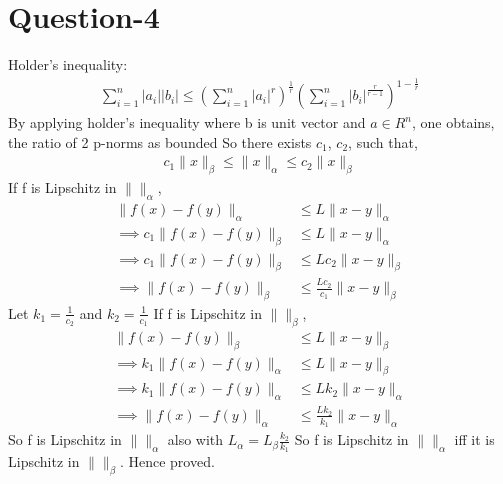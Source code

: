 \documentclass{article}
\begin{document}
\section*{Question-4}
Holder's inequality:
\begin{align}
    \sum\limits_{i=1}^n |a_i||b_i|\leq \left(\sum\limits_{i=1}^n|a_i|^r\right)^{\frac{1}{r}}\left(\sum\limits_{i=1}^n|b_i|^{\frac{r}{r-1}}\right)^{1-\frac{1}{r}} 
\end{align}
By applying holder's inequality where b is unit vector and $a \in R^n$, one obtains, the ratio of 2 p-norms as bounded
So there exists $c_1$, $c_2$, such that,
\begin{align}
    c_1\|x\|_\beta \leq \|x\|_\alpha \leq c_2\|x\|_\beta
\end{align}
If f is Lipschitz in $\|\|_{\alpha}$,
\begin{align*}
    \|f(x) - f(y)\|_\alpha &\leq L\|x-y\|_\alpha \\
    \implies c_1\|f(x) - f(y)\|_\beta 
    &\leq L\|x-y\|_\alpha  \\
    \implies c_1\|f(x) - f(y)\|_\beta 
    &\leq Lc_2\|x-y\|_\beta \\
    \implies \|f(x) - f(y)\|_\beta 
    &\leq \frac{Lc_2}{c_1}\|x-y\|_\beta
\end{align*}
Let $k_1 = \frac{1}{c_2}$ and $k_2 = \frac{1}{c_1}$
If f is Lipschitz in $\|\|_{\beta}$,
\begin{align*}
    \|f(x) - f(y)\|_\beta &\leq L\|x-y\|_\beta  \\
    \implies k_1\|f(x) - f(y)\|_\alpha
    &\leq L\|x-y\|_\beta \\
    \implies k_1\|f(x) - f(y)\|_\alpha
    &\leq Lk_2\|x-y\|_\alpha \\
    \implies \|f(x) - f(y)\|_\alpha 
    &\leq \frac{Lk_2}{k_1}\|x-y\|_\alpha
\end{align*}
So f is Lipschitz in $\|\|_\alpha$ also with $L_\alpha = L_\beta\frac{k_2}{k_1}$
So f is Lipschitz in $\|\|_\alpha$ iff it is Lipschitz in $\|\|_\beta$. Hence proved.
\end{document}
